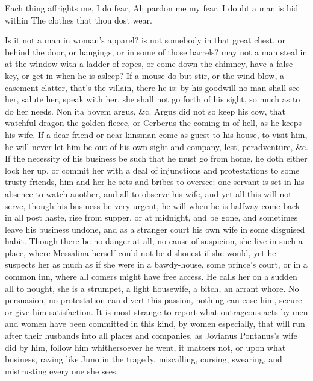 {Each thing affrights me, I do fear,
Ah pardon me my fear,
I doubt a man is hid within
The clothes that thou dost wear.

Is it not a man in woman's apparel? is not somebody in that great
chest, or behind the door, or hangings, or in some of those barrels?
may not a man steal in at the window with a ladder of ropes, or come
down the chimney, have a false key, or get in when he is asleep? If a
mouse do but stir, or the wind blow, a casement clatter, that's the
villain, there he is: by his goodwill no man shall see her, salute her,
speak with her, she shall not go forth of his sight, so much as to do
her needs. Non ita bovem argus, \&c. Argus did not so keep his
cow, that watchful dragon the golden fleece, or Cerberus the coming in
of hell, as he keeps his wife. If a dear friend or near kinsman come as
guest to his house, to visit him, he will never let him be out of his
own sight and company, lest, peradventure, \&c. If the necessity of his
business be such that he must go from home, he doth either lock her up,
or commit her with a deal of injunctions and protestations to some
trusty friends, him and her he sets and bribes to oversee: one servant
is set in his absence to watch another, and all to observe his wife,
and yet all this will not serve, though his business be very urgent, he
will when he is halfway come back in all post haste, rise from supper,
or at midnight, and be gone, and sometimes leave his business undone,
and as a stranger court his own wife in some disguised habit. Though
there be no danger at all, no cause of suspicion, she live in such a
place, where Messalina herself could not be dishonest if she would, yet
he suspects her as much as if she were in a bawdy-house, some prince's
court, or in a common inn, where all comers might have free access. He
calls her on a sudden all to nought, she is a strumpet, a light
housewife, a bitch, an arrant whore. No persuasion, no protestation can
divert this passion, nothing can ease him, secure or give him
satisfaction. It is most strange to report what outrageous acts by men
and women have been committed in this kind, by women especially, that
will run after their husbands into all places and companies, as
Jovianus Pontanus's wife did by him, follow him whithersoever he went,
it matters not, or upon what business, raving like Juno in the tragedy,
miscalling, cursing, swearing, and mistrusting every one she sees.

}
